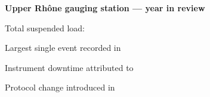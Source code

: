 \documentclass[11pt,a4paper]{article}
\begin{document}
\ibpagebreak


\ibrubricgapfill
{}
\begin{ibstimulus}
  \textbf{Upper Rhône gauging station --- year in review}

  \begin{ibstimlist}
    \item Total suspended load: \ibgapnext
    \item Largest single event recorded in \ibgapnext
    \item Instrument downtime attributed to \ibgapnext
    \item Protocol change introduced in \ibgapnext
  \end{ibstimlist}
\end{ibstimulus}
\ibgapq[October]
\end{document}
